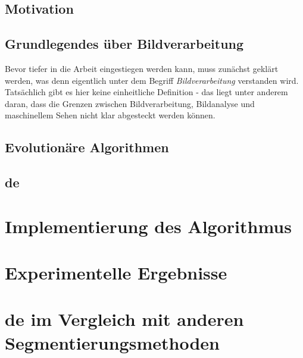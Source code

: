 \documentclass[10pt,a4paper,abstraction]{scrreprt}
\begin{document}
	\section{Motivation}
	\label{sec:motivation}
	
	\section{Grundlegendes über Bildverarbeitung}
	\label{sec:bild-basics}
	
	Bevor tiefer in die Arbeit eingestiegen werden kann, muss zunächst geklärt werden, was denn eigentlich unter dem Begriff \textit{Bildverarbeitung} verstanden wird. Tatsächlich gibt es hier keine einheitliche Definition - das liegt unter anderem daran, dass die Grenzen zwischen Bildverarbeitung, Bildanalyse und maschinellem Sehen nicht klar abgesteckt werden können. 
	\section{Evolutionäre Algorithmen}
	\label{sec:evol}
	
	
	\section{\gls{de}}
	\chapter{Implementierung des Algorithmus}
	\label{sec:imp}
	\chapter{Experimentelle Ergebnisse}
	\label{sec:ex}
	\chapter{\gls{de} im Vergleich mit anderen Segmentierungsmethoden}
	\label{sec:de-vergleich}
\end{document}
